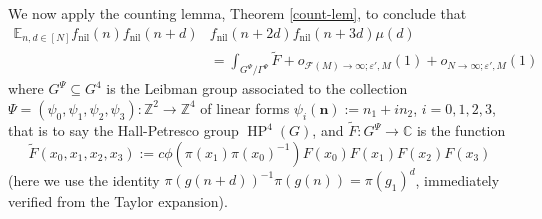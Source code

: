 \documentclass[11pt,reqno]{amsart}
\numberwithin{equation}{section}
\theoremstyle{plain}
\theoremstyle{definition}
\newcommand\E{{\mathbb{E}}}
\newcommand\Z{\mathbb{Z}}
\newcommand\C{\mathbb{C}}
\newcommand\1{{\bf 1}}
\newcommand\2{{\bf 2}}
\newcommand\eps{\varepsilon}
\newcommand\HP{\operatorname{HP}}
\newcommand\nil{{\operatorname{nil}}}
\newcommand\Grow{{\mathcal F}}
\begin{document}
We now apply the counting lemma, Theorem \ref{count-lem}, to conclude that
\begin{align}\nonumber 
\E_{n,d \in [N]} f_\nil(n) f_\nil(n+d)&  f_\nil(n+2d) f_\nil(n+3d)\mu(d) \\ & = \int_{G^{\Psi}/\Gamma^{\Psi}} \tilde F + o_{\Grow(M) \to \infty; \eps',M}(1) + o_{N \to \infty; \eps',M}(1) \label{counting}
\end{align}
where $G^{\Psi} \subseteq G^4$ is the Leibman group associated to the collection $\Psi = (\psi_0,\psi_1,\psi_2,\psi_3): \Z^2 \to \Z^4$ of linear forms $\psi_i(\mathbf{n}) := n_1 + i n_2$, $i = 0,1,2,3$, that is to say the Hall-Petresco group $\HP^4(G)$, and $\tilde F: G^{\Psi} \to \C$ is the function
$$ \tilde F( x_0, x_1, x_2, x_3 ) := c \phi(\pi(x_1) \pi(x_0)^{-1}) F(x_0) F(x_1) F(x_2) F(x_3)$$
(here we use the identity $\pi(g(n+d))^{-1} \pi(g(n)) = \pi(g_1)^d$, immediately verified from the Taylor expansion).  
\end{document}
